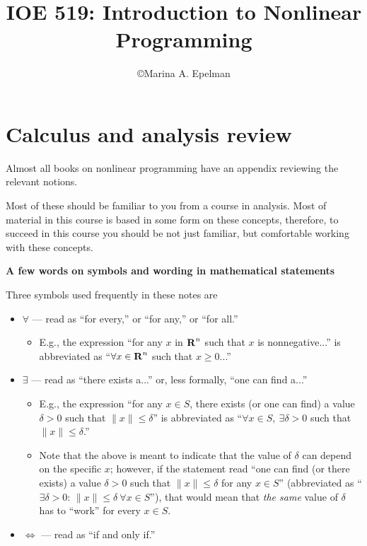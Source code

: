 \documentclass[11pt]{article}
\begin{document}
\title{IOE 519: Introduction to Nonlinear Programming}
\author{\copyright Marina A. Epelman}
\maketitle
\section{Calculus and analysis review}

Almost all books on nonlinear programming have an appendix reviewing the relevant notions. 

Most of these should be familiar to you from a course in analysis. Most of material in this course is based in some form on these concepts, therefore, to succeed in this course you should be not just familiar, but comfortable working with these concepts.
\begin{center}
\textbf{A few words on symbols and wording in mathematical statements}
\end{center}
Three symbols used frequently in these notes are
\begin{itemize}
\item $\forall$ --- read as ``for every,'' or ``for any,'' or ``for all.''
\begin{itemize}
\item E.g., the expression ``for any $x$ in ${\mbox{\textbf{R}}}^n$ such that $x$ is nonnegative...'' is abbreviated as ``$\forall x\in{\mbox{\textbf{R}}}^n$ such that $x\ge0$...''
\end{itemize}
\item $\exists$  --- read as ``there exists a...'' or, less formally, ``one can find a...''
\begin{itemize}
\item E.g., the expression ``for any $x\in S$, there exists (or one can find) a value $\delta>0$ such that $\|x\|\le \delta$'' is abbreviated as ``$\forall x\in S,\ \exists \delta>0$ such that  $\|x\|\le \delta$.''
\item Note that the above is meant to indicate that the value of $\delta$ can depend on the specific $x$; however, if the statement read ``one can find (or there exists) a value $\delta>0$ such that  $\|x\|\le \delta$ for any $x\in S$'' (abbreviated as ``$\exists\delta>0$: $\|x\|\le \delta\ \forall x\in S$''), that would mean that \emph{the same} value of $\delta$ has to ``work'' for every $x\in S$.
\end{itemize}
\item $\Leftrightarrow$ --- read as ``if and only if.''
\end{itemize}
\end{document}
